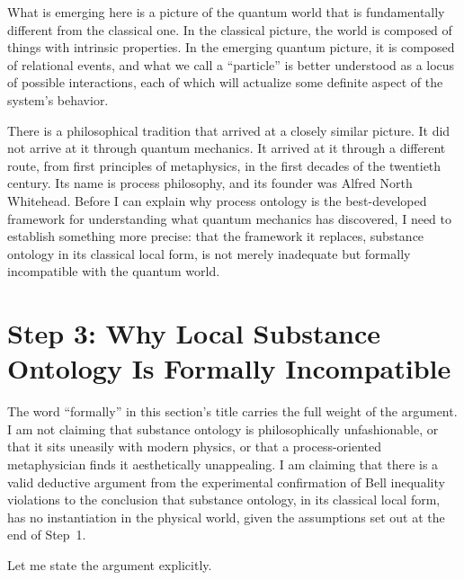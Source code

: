 What is emerging here is a picture of the quantum world that is fundamentally
different from the classical one.
In the classical picture, the world is composed of things with intrinsic
properties.
In the emerging quantum picture, it is composed of relational events, and what we
call a ``particle'' is better understood as a locus of possible interactions, each
of which will actualize some definite aspect of the system's behavior.

There is a philosophical tradition that arrived at a closely similar picture.
It did not arrive at it through quantum mechanics.
It arrived at it through a different route, from first principles of metaphysics,
in the first decades of the twentieth century.
Its name is process philosophy, and its founder was Alfred North Whitehead.
Before I can explain why process ontology is the best-developed framework for
understanding what quantum mechanics has discovered, I need to establish something
more precise: that the framework it replaces, substance ontology in its
classical local form, is not merely inadequate but formally incompatible with the
quantum world.


\section{Step 3: Why Local Substance Ontology Is Formally Incompatible}
\label{sec:ch5-step3}

The word ``formally'' in this section's title carries the full weight of the
argument.
I am not claiming that substance ontology is philosophically unfashionable,
or that it sits uneasily with modern physics, or that a process-oriented
metaphysician finds it aesthetically unappealing.
I am claiming that there is a valid deductive argument from the experimental
confirmation of Bell inequality violations to the conclusion that substance
ontology, in its classical local form, has no instantiation in the physical world,
given the assumptions set out at the end of Step~1.

Let me state the argument explicitly.

